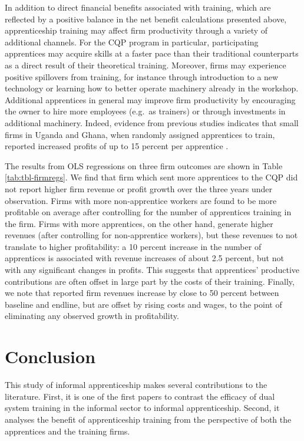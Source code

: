 \documentclass[
  a4paper, twoside, 12pt]{book}
\begin{document}
In addition to direct financial benefits associated with training, which are reflected by a positive balance in the net benefit calculations presented above, apprenticeship training may affect firm productivity through a variety of additional channels. For the CQP program in particular, participating apprentices may acquire skills at a faster pace than their traditional counterparts as a direct result of their theoretical training. Moreover, firms may experience positive spillovers from training, for instance through introduction to a new technology or learning how to better operate machinery already in the workshop. Additional apprentices in general may improve firm productivity by encouraging the owner to hire more employees (e.g.~as trainers) or through investments in additional machinery. Indeed, evidence from previous studies indicates that small firms in Uganda and Ghana, when randomly assigned apprentices to train, reported increased profits of up to 15 percent per apprentice \autocite{hardy2022,alfonsi2020}.

The results from OLS regressions on three firm outcomes are shown in Table \ref{tab:tbl-firmregs}. We find that firm which sent more apprentices to the CQP did not report higher firm revenue or profit growth over the three years under observation. Firms with more non-apprentice workers are found to be more profitable on average after controlling for the number of apprentices training in the firm. Firms with more apprentices, on the other hand, generate higher revenues (after controlling for non-apprentice workers), but these revenues to not translate to higher profitability: a 10 percent increase in the number of apprentices is associated with revenue increases of about 2.5 percent, but not with any significant changes in profits. This suggests that apprentices' productive contributions are often offset in large part by the costs of their training. Finally, we note that reported firm revenues increase by close to 50 percent between baseline and endline, but are offset by rising costs and wages, to the point of eliminating any observed growth in profitability.

\hypertarget{conclusion}{%
\section{Conclusion}\label{conclusion}}

This study of informal apprenticeship makes several contributions to the literature. First, it is one of the first papers to contrast the efficacy of dual system training in the informal sector to informal apprenticeship. Second, it analyses the benefit of apprenticeship training from the perspective of both the apprentices and the training firms.
\end{document}
